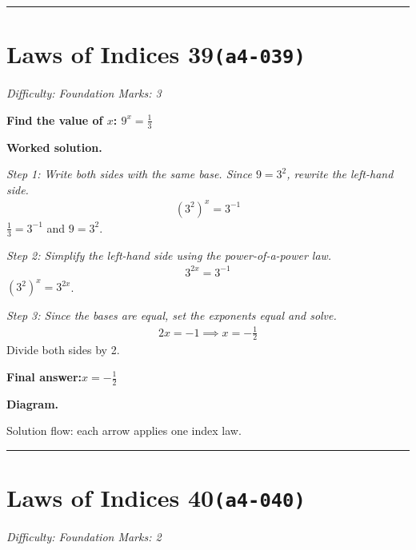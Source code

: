 \documentclass[11pt]{article}
\newcommand{\question}[1]{\par\medskip\noindent\textbf{#1}\par}
\begin{document}
\medskip\hrule

\section*{Laws of Indices 39\quad\small\texttt{(a4-039)}}
\textit{Difficulty: Foundation \quad\textbar\quad Marks: 3}

\question{Find the value of \( x \): \( 9^x = \frac{1}{3} \)}

\textbf{Worked solution.}

\textit{Step 1: Write both sides with the same base. Since \( 9 = 3^2 \), rewrite the left-hand side.}
\[\begin{gathered}
(3^2)^x = 3^{-1}
\end{gathered}\]
\( \frac{1}{3} = 3^{-1} \) and \( 9 = 3^2 \).

\textit{Step 2: Simplify the left-hand side using the power-of-a-power law.}
\[\begin{gathered}
3^{2x} = 3^{-1}
\end{gathered}\]
\( (3^2)^x = 3^{2x} \).

\textit{Step 3: Since the bases are equal, set the exponents equal and solve.}
\[\begin{gathered}
2x = -1 \implies x = -\frac{1}{2}
\end{gathered}\]
Divide both sides by 2.

\begin{answerbox}
\textbf{Final answer:}\quad \(\displaystyle x = -\frac{1}{2}\)
\end{answerbox}
\textbf{Diagram.}

\begin{center}
\end{center}
\small Solution flow: each arrow applies one index law.\normalsize

\medskip\hrule

\section*{Laws of Indices 40\quad\small\texttt{(a4-040)}}
\textit{Difficulty: Foundation \quad\textbar\quad Marks: 2}
\end{document}
